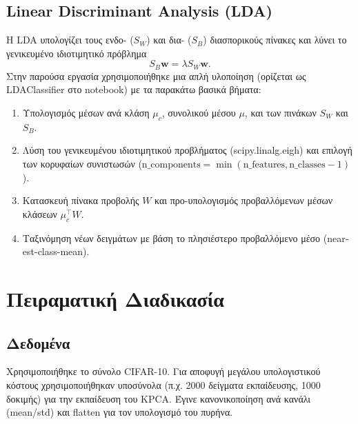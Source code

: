 \documentclass[a4paper,11pt]{article}
\newcommand{\lt}[1]{\foreignlanguage{english}{#1}}
\begin{document}
\subsection{\lt{Linear Discriminant Analysis} (\lt{LDA})}
Η \lt{LDA} υπολογίζει τους ενδο- ($S_W$) και δια- ($S_B$) διασπορικούς πίνακες και λύνει το γενικευμένο ιδιοτιμητικό πρόβλημα
\begin{equation}
S_B \mathbf{w} = \lambda S_W \mathbf{w}.
\end{equation}
Στην παρούσα εργασία χρησιμοποιήθηκε μια απλή υλοποίηση (ορίζεται ως \lt{LDAClassifier} στο \lt{notebook}) με τα παρακάτω βασικά βήματα:
\begin{enumerate}
    \item Υπολογισμός μέσων ανά κλάση $\mu_c$, συνολικού μέσου $\mu$, και των πινάκων $S_W$ και $S_B$.
    \item Λύση του γενικευμένου ιδιοτιμητικού προβλήματος (\lt{scipy.linalg.eigh}) και επιλογή των κορυφαίων συνιστωσών \lt{($\text{n\_components}=\min(\text{n\_features},\text{n\_classes}-1)$).}
    \item Κατασκευή πίνακα προβολής $W$ και προ-υπολογισμός προβαλλόμενων μέσων κλάσεων $\mu_c^\top W$.
    \item Ταξινόμηση νέων δειγμάτων με βάση το πλησιέστερο προβαλλόμενο μέσο \lt{(nearest-class-mean).}
\end{enumerate}

\newpage

\section{Πειραματική Διαδικασία}
\subsection{Δεδομένα}
Χρησιμοποιήθηκε το σύνολο \lt{CIFAR-10}. Για αποφυγή μεγάλου υπολογιστικού κόστους χρησιμοποιήθηκαν υποσύνολα (π.χ. 2000 δείγματα εκπαίδευσης, 1000 δοκιμής) για την εκπαίδευση του \lt{KPCA}. Έγινε κανονικοποίηση ανά κανάλι (mean/std) και \lt{flatten} για τον υπολογισμό του πυρήνα.
\end{document}
